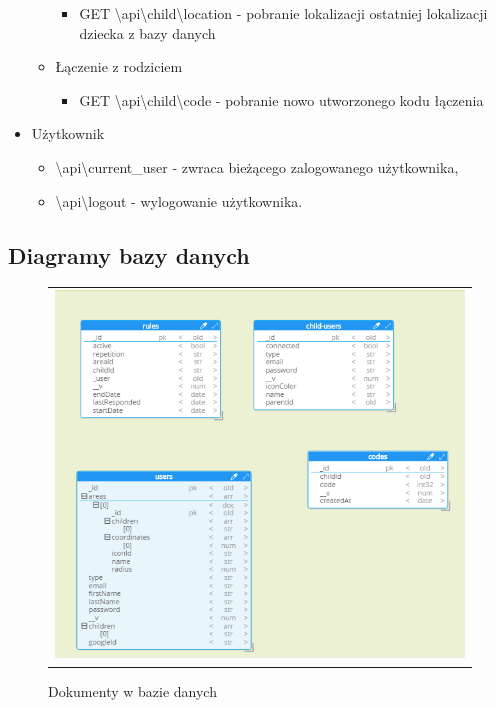 \documentclass{sprawozdanie-agh}
\begin{document}
\begin{itemize}
\begin{itemize}
\begin{itemize}
						\item GET \textbackslash api\textbackslash child\textbackslash location - pobranie lokalizacji ostatniej lokalizacji dziecka z bazy danych		
					\end{itemize}				
						\item Łączenie z rodziciem
					\begin{itemize}
						\item GET \textbackslash api\textbackslash child\textbackslash code - pobranie nowo utworzonego kodu łączenia						
					\end{itemize}

				\end{itemize}
				\item Użytkownik
				\begin{itemize}
					\item \textbackslash api\textbackslash current\_user - zwraca bieżącego zalogowanego użytkownika,
					\item \textbackslash api\textbackslash logout - wylogowanie użytkownika.
				\end{itemize}
			\end{itemize}
		
		\subsection{Diagramy bazy danych}

			\begin{figure}[H] 
				\centering
				\begin{tabular}{c}
					\includegraphics[width=.95\textwidth]{relacjeWBazie.png}
				\end{tabular} 
				\caption{Dokumenty w bazie danych}
			\end{figure}
\end{document}
